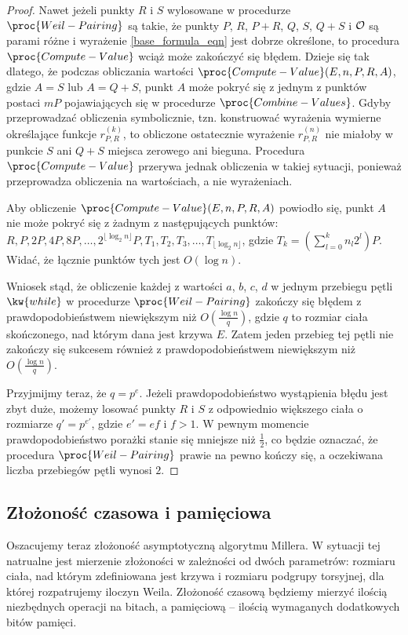 \begin{proof}
Nawet jeżeli punkty $R$ i $S$ wylosowane w procedurze $\proc{Weil-Pairing}$
są takie, że punkty $P$, $R$, $P+R$, $Q$, $S$, $Q+S$ i $\mathcal{O}$
są parami różne
i wyrażenie \ref{base_formula_eqn} jest dobrze określone,
to procedura $\proc{Compute-Value}$ wciąż może zakończyć się błędem.
Dzieje się tak dlatego,
że podczas obliczania wartości $\proc{Compute-Value}(E, n, P, R, A)$,
gdzie $A = S$ lub $A = Q+S$,
punkt $A$ może pokryć się z jednym z punktów postaci $mP$
pojawiających się w procedurze $\proc{Combine-Values}$.
Gdyby przeprowadzać obliczenia symbolicznie,
tzn. konstruować wyrażenia wymierne określające funkcje $r_{P,R}^{(k)}$,
to obliczone ostatecznie wyrażenie $r_{P,R}^{(n)}$
nie miałoby w punkcie $S$ ani $Q+S$ miejsca zerowego ani bieguna.
Procedura $\proc{Compute-Value}$ przerywa jednak obliczenia w takiej sytuacji,
ponieważ przeprowadza obliczenia na wartościach, a nie wyrażeniach.

Aby obliczenie $\proc{Compute-Value}(E, n, P, R, A)$ powiodło się,
punkt $A$ nie może pokryć się z żadnym z następujących punktów:
$R, P, 2P, 4P, 8P, \ldots, 2^{\lfloor\log_2 n\rfloor}P,
T_1, T_2, T_3, \ldots, T_{\lfloor\log_2 n\rfloor}$,
gdzie $T_k = \left(\sum_{l=0}^k n_l2^l\right)P$.
Widać, że łącznie punktów tych jest $O(\log n)$.

Wniosek stąd, że obliczenie każdej z wartości $a$, $b$, $c$, $d$
w jednym przebiegu pętli $\kw{while}$ w procedurze $\proc{Weil-Pairing}$
zakończy się błędem
z prawdopodobieństwem niewiększym niż $O(\frac{\log n}{q})$,
gdzie $q$ to rozmiar ciała skończonego, nad którym dana jest krzywa $E$.
Zatem jeden przebieg tej pętli nie zakończy się sukcesem
również z prawdopodobieństwem niewiększym niż $O(\frac{\log n}{q})$.

Przyjmijmy teraz, że $q = p^e$.
Jeżeli prawdopodobieństwo wystąpienia błędu jest zbyt duże,
możemy losować punkty $R$ i $S$ z odpowiednio większego ciała
o rozmiarze $q' = p^{e'}$, gdzie $e' = ef$ i $f > 1$.
W pewnym momencie prawdopodobieństwo porażki
stanie się mniejsze niż $\frac{1}{2}$,
co będzie oznaczać,
że procedura $\proc{Weil-Pairing}$ prawie na pewno kończy się,
a oczekiwana liczba przebiegów pętli wynosi $2$.
\end{proof}

\subsection*{Złożoność czasowa i pamięciowa}

Oszacujemy teraz złożoność asymptotyczną algorytmu Millera.
W sytuacji tej natrualne jest mierzenie złożoności
w zależności od dwóch parametrów:
rozmiaru ciała, nad którym zdefiniowana jest krzywa
i rozmiaru podgrupy torsyjnej,
dla której rozpatrujemy iloczyn Weila.
Złożoność czasową będziemy mierzyć ilością niezbędnych operacji na bitach,
a pamięciową -- ilością wymaganych dodatkowych bitów pamięci.


